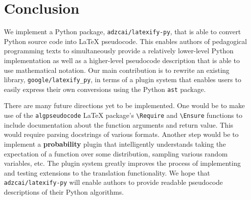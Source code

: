 \documentclass{article}
\newcommand{\ourpkg}{\texttt{adzcai/latexify-py}}
\newcommand{\theirpkg}{\texttt{google/latexify\_py}}
\newcommand{\vocab}[1]{\textbf{#1}}
\begin{document}
\section{Conclusion}

We implement a Python package, \ourpkg{}, that is able to convert Python source code into \LaTeX{} pseudocode.
This enables authors of pedagogical programming texts to simultaneously provide a relatively lower-level Python implementation
as well as a higher-level pseudocode description that is able to use mathematical notation.
Our main contribution is to rewrite an existing library, \theirpkg{},
in terms of a plugin system that enables users to easily express their own conversions using the Python \verb|ast| package.

There are many future directions yet to be implemented.
One would be to make use of the \verb|algpseudocode| \LaTeX{} package's \verb|\Require| and \verb|\Ensure| functions
to include documentation about the function arguments and return value.
This would require parsing docstrings of various formats.
Another step would be to implement a \vocab{probability} plugin
that intelligently understands taking the expectation of a function over some distribution,
sampling various random variables, etc.
The plugin system greatly improves the process of implementing and testing extensions to the translation functionality.
We hope that \ourpkg{} will enable authors to provide readable pseudocode descriptions of their Python algorithms.
\end{document}
